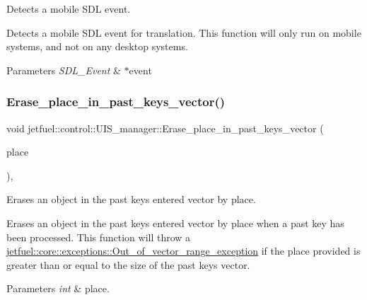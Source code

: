 Detects a mobile S\+DL event. 

Detects a mobile S\+DL event for translation. This function will only run on mobile systems, and not on any desktop systems.


\begin{DoxyParams}{Parameters}
{\em S\+D\+L\+\_\+\+Event} & $\ast$event \\
\hline
\end{DoxyParams}
\mbox{\label{classjetfuel_1_1control_1_1UIS__manager_ac2df113cedc2e78b29426edcb23c5f24}} 
\subsubsection{\texorpdfstring{Erase\+\_\+place\+\_\+in\+\_\+past\+\_\+keys\+\_\+vector()}{Erase\_place\_in\_past\_keys\_vector()}}
{\footnotesize\ttfamily void jetfuel\+::control\+::\+U\+I\+S\+\_\+manager\+::\+Erase\+\_\+place\+\_\+in\+\_\+past\+\_\+keys\+\_\+vector (\begin{DoxyParamCaption}\item[{const int}]{place }\end{DoxyParamCaption})\hspace{0.3cm}{\ttfamily [inline]}, {\ttfamily [protected]}}



Erases an object in the past keys entered vector by place. 

Erases an object in the past keys entered vector by place when a past key has been processed. This function will throw a \hyperlink{classjetfuel_1_1core_1_1exceptions_1_1Out__of__vector__range__exception}{jetfuel\+::core\+::exceptions\+::\+Out\+\_\+of\+\_\+vector\+\_\+range\+\_\+exception} if the place provided is greater than or equal to the size of the past keys vector.


\begin{DoxyParams}{Parameters}
{\em int} & place. \\
\hline
\end{DoxyParams}
\mbox{\label{classjetfuel_1_1control_1_1UIS__manager_af905f08ba629b3556966f655f24b0b0f}} 

